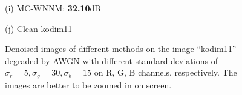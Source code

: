 \documentclass[10pt,onecolumn,letterpaper]{article}
\begin{document}
\begin{figure}
{\begin{minipage}[t]{0.195\textwidth}
{\footnotesize (i) MC-WNNM: \textbf{32.10}dB}
\end{minipage}
\begin{minipage}[t]{0.195\textwidth}
\centering
{}
{\footnotesize (j) Clean kodim11}
\end{minipage}
}
\caption{Denoised images of different methods on the image ``kodim11'' degraded by AWGN with different standard deviations of $\sigma_{r}=5, \sigma_{g}=30, \sigma_{b}=15$ on R, G, B channels, respectively. The images are better to be zoomed in on screen.}
\label{f1}
\vspace{2mm}
\end{figure}
\end{document}
